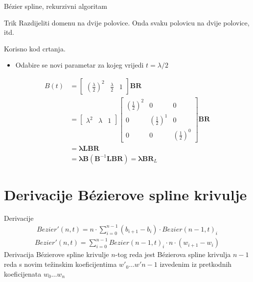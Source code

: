 \documentclass[9pt]{beamer}
\begin{document}
\begin{frame}{B\'{e}zier spline, rekurzivni algoritam}
	\begin{block}{Trik}
		Razdijeliti domenu na dvije polovice. Onda svaku polovicu na dvije polovice, itd. 
		
		Korisno kod crtanja.
	\end{block}
	\begin{itemize}
		\item Odabire se novi parametar za kojeg vrijedi $t = \lambda/2$ 
	\end{itemize}	
	\begin{align*}
	B(t) &= \begin{bmatrix}
	\left(\frac{\lambda}{2}\right)^2 & \frac{\lambda}{2} & 1 
	\end{bmatrix}\mathbf{B}\mathbf{R} \\
	&= \begin{bmatrix}
	\lambda^2 & \lambda & 1 
	\end{bmatrix} 
	\begin{bmatrix}
	\left(\frac{1}{2}\right)^2 &  0 & 0 \\
	0 &  \left(\frac{1}{2}\right)^1 & 0 \\
	0 & 0 & \left(\frac{1}{2}\right)^0
	\end{bmatrix}
	\mathbf{B}\mathbf{R} \\
	&= \mathbf{\lambda}\mathbf{L}\mathbf{B}\mathbf{R} \\
	&= \mathbf{\lambda}\mathbf{B}(\mathbf{B}^{-1}\mathbf{L}\mathbf{B}\mathbf{R})
	=  \mathbf{\lambda}\mathbf{B}\mathbf{R}_L
	\end{align*}
\end{frame}

\section{Derivacije B\'{e}zierove spline krivulje}
\begin{frame}{Derivacije}
	\begin{align*}
	Bezier'(n,t) = n \cdot \sum_{i=0}^{n-1} (b_{i+1}-b_i) \cdot Bezier(n-1,t)_i 
	\end{align*}
	\begin{align*}
	Bezier'(n,t) = \sum_{i=0}^{n-1} Bezier(n-1,t)_i \cdot n \cdot (w_{i+1}-w_i)
	\end{align*}
	Derivacija B\'{e}zierove spline krivulje $n$-tog reda jest B\'{e}zierova spline krivulja $n-1$ reda s novim težinskim koeficijentima $w'_{0}\ldots w'{n-1}$ izvedenim iz pretkodnih koeficijenata $w_{0}\ldots w_{n}$
	
	
\end{frame}
\end{document}
